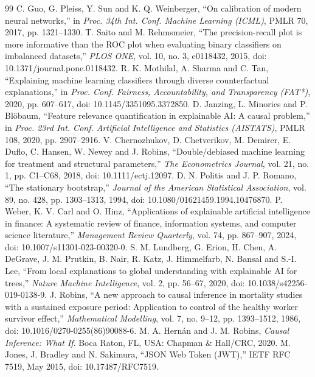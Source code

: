 \begin{thebibliography}{99}
 C. Guo, G. Pleiss, Y. Sun and K. Q. Weinberger, ``On calibration of modern neural networks,'' in \textit{Proc. 34th Int. Conf. Machine Learning (ICML)}, PMLR 70, 2017, pp. 1321--1330.
 T. Saito and M. Rehmsmeier, ``The precision-recall plot is more informative than the ROC plot when evaluating binary classifiers on imbalanced datasets,'' \textit{PLOS ONE}, vol. 10, no. 3, e0118432, 2015, doi: 10.1371/journal.pone.0118432.
 R. K. Mothilal, A. Sharma and C. Tan, ``Explaining machine learning classifiers through diverse counterfactual explanations,'' in \textit{Proc. Conf. Fairness, Accountability, and Transparency (FAT*)}, 2020, pp. 607--617, doi: 10.1145/3351095.3372850.
 D. Janzing, L. Minorics and P. Blöbaum, ``Feature relevance quantification in explainable AI: A causal problem,'' in \textit{Proc. 23rd Int. Conf. Artificial Intelligence and Statistics (AISTATS)}, PMLR 108, 2020, pp. 2907--2916.
 V. Chernozhukov, D. Chetverikov, M. Demirer, E. Duflo, C. Hansen, W. Newey and J. Robins, ``Double/debiased machine learning for treatment and structural parameters,'' \textit{The Econometrics Journal}, vol. 21, no. 1, pp. C1--C68, 2018, doi: 10.1111/ectj.12097.
 D. N. Politis and J. P. Romano, ``The stationary bootstrap,'' \textit{Journal of the American Statistical Association}, vol. 89, no. 428, pp. 1303--1313, 1994, doi: 10.1080/01621459.1994.10476870.
 P. Weber, K. V. Carl and O. Hinz, ``Applications of explainable artificial intelligence in finance: A systematic review of finance, information systems, and computer science literature,'' \textit{Management Review Quarterly}, vol. 74, pp. 867--907, 2024, doi: 10.1007/s11301-023-00320-0.
 S. M. Lundberg, G. Erion, H. Chen, A. DeGrave, J. M. Prutkin, B. Nair, R. Katz, J. Himmelfarb, N. Bansal and S.-I. Lee, ``From local explanations to global understanding with explainable AI for trees,'' \textit{Nature Machine Intelligence}, vol. 2, pp. 56--67, 2020, doi: 10.1038/s42256-019-0138-9.
 J. Robins, ``A new approach to causal inference in mortality studies with a sustained exposure period: Application to control of the healthy worker survivor effect,'' \textit{Mathematical Modelling}, vol. 7, no. 9--12, pp. 1393--1512, 1986, doi: 10.1016/0270-0255(86)90088-6.
 M. A. Hernán and J. M. Robins, \textit{Causal Inference: What If}. Boca Raton, FL, USA: Chapman \& Hall/CRC, 2020.
 M. Jones, J. Bradley and N. Sakimura, ``JSON Web Token (JWT),'' IETF RFC 7519, May 2015, doi: 10.17487/RFC7519.

\end{thebibliography}
